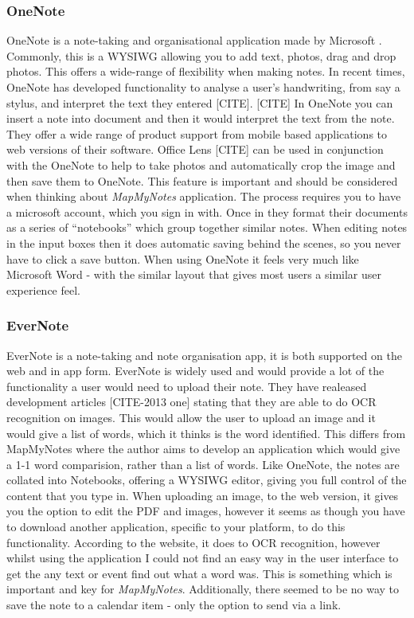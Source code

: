 \subsubsection{OneNote}
OneNote is a note-taking and organisational application made by Microsoft  \cite{citeulike:onenote}. Commonly, this is a WYSIWG allowing you to add text, photos, drag and drop photos. This offers a wide-range of flexibility when making notes. In recent times, OneNote has developed functionality to analyse a user's handwriting, from say a stylus, and interpret the text they entered [CITE]. [CITE] In OneNote you can insert a note into document and then it would interpret the text from the note. They offer a wide range of product support from mobile based applications to web versions of their software. Office Lens [CITE] can be used in conjunction with the OneNote to help to take photos and automatically crop the image and then save them to OneNote. This feature is important and should be considered when thinking about \textit{MapMyNotes} application. The process requires you to have a microsoft account, which you sign in with. Once in they format their documents as a series of ``notebooks'' which group together similar notes. When editing notes in the input boxes then it does automatic saving behind the scenes, so you never have to click a save button. When using OneNote it feels very much like Microsoft Word - with the similar layout that gives most users a similar user experience feel.

\subsubsection{EverNote}
EverNote is a note-taking and note organisation app, it is both supported on the web and in app form. EverNote is widely used and would provide a lot of the functionality a user would need to upload their note. They have realeased development articles [CITE-2013 one] stating that they are able to do OCR recognition on images. This would allow the user to upload an image and it would give a list of words, which it thinks is the word identified. This differs from MapMyNotes where the author aims to develop an application which would give a 1-1 word comparision, rather than a list of words. Like OneNote, the notes are collated into Notebooks, offering a WYSIWG editor, giving you full control of the content that you type in. When uploading an image, to the web version, it gives you the option to edit the PDF and images, however it seems as though you have to download another application, specific to your platform,  to do this functionality. According to the website, it does to OCR recognition, however whilst using the application I could not find an easy way in the user interface to get the any text or event find out what a word was. This is something which is important and key for \textit{MapMyNotes}. Additionally, there seemed to be no way to save the note to a calendar item - only the option to send via a link. 
